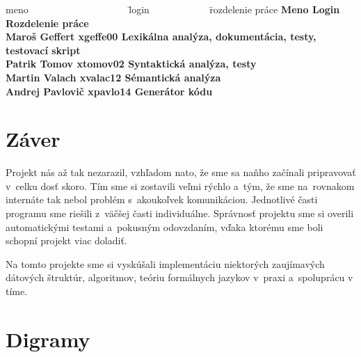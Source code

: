 \documentclass[a4paper, 11pt]{article}
\begin{document}
    \begin{tabbing}
    meno ~~~~~~~~~~~~~~~~~~~~\= login ~~~~~~~~~~~
    \= rozdelenie práce \kill
    \bfseries Meno \>
    \bfseries Login \>
    \bfseries Rozdelenie práce \\[2mm]
    Maroš Geffert \> xgeffe00 \> Lexikálna analýza, dokumentácia, testy, testovací skript \\
    Patrik Tomov \> xtomov02 \> Syntaktická analýza, testy\\
    Martin Valach \> xvalac12 \> Sémantická analýza \\
    Andrej Pavlovič \> xpavlo14 \> Generátor kódu
    \end{tabbing}

    \pagebreak
    \section{Záver}
    
    Projekt nás až tak nezarazil, vzhľadom nato, že sme sa naňho začínali pripravovať v~celku dosť skoro. Tím sme si zostavili veľmi rýchlo a~tým, že sme na~rovnakom internáte tak nebol problém s~akoukoľvek komunikáciou. Jednotlivé časti programu sme riešili z~väčšej časti individuálne.
    Správnosť projektu sme si overili automatickými testami a~pokusným odovzdaním, vďaka ktorému sme boli schopní projekt viac doladiť.
    
    Na tomto projekte sme si vyskúšali implementáciu niektorých zaujímavých dátových štruktúr, algoritmov, teóriu formálnych jazykov v~praxi a~spoluprácu v tíme.
    
    \clearpage
    
    \section{Digramy}
\end{document}

